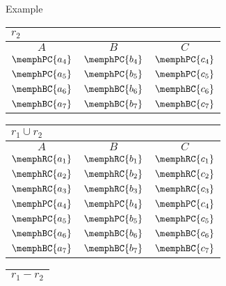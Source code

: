 \begin{multicols}{2}
\begin{CheatsheetEntryFrame}
\begin{RelAlgSubsection}{Example}
{                \begin{tabular}{|ccc|}
                    \multicolumn{3}{l}{\normalsize $r_2$}
                        \\ \hline
                    \multicolumn{1}{|c}{$A$}
                        & \multicolumn{1}{c}{$B$}
                        & \multicolumn{1}{c|}{$C$}
                        \\ \hline\hline
                    $\memphPC{a_4}$ & $\memphPC{b_4}$ & $\memphPC{c_4}$ \\
                    $\memphPC{a_5}$ & $\memphPC{b_5}$ & $\memphPC{c_5}$ \\
                    $\memphBC{a_6}$ & $\memphBC{b_6}$ & $\memphBC{c_6}$ \\
                    $\memphBC{a_7}$ & $\memphBC{b_7}$ & $\memphBC{c_7}$ \\ \hline
                \end{tabular}
            }{%
                \footnotesize%
                \begin{tabular}{|ccc|}
                    \multicolumn{3}{l}{\normalsize $r_1 \cup r_2$}
                        \\ \hline
                    \multicolumn{1}{|c}{$A$}
                        & \multicolumn{1}{c}{$B$}
                        & \multicolumn{1}{c|}{$C$}
                        \\ \hline\hline
                    $\memphRC{a_1}$ & $\memphRC{b_1}$ & $\memphRC{c_1}$ \\
                    $\memphRC{a_2}$ & $\memphRC{b_2}$ & $\memphRC{c_2}$ \\
                    $\memphRC{a_3}$ & $\memphRC{b_3}$ & $\memphRC{c_3}$ \\
                    $\memphPC{a_4}$ & $\memphPC{b_4}$ & $\memphPC{c_4}$ \\
                    $\memphPC{a_5}$ & $\memphPC{b_5}$ & $\memphPC{c_5}$ \\
                    $\memphBC{a_6}$ & $\memphBC{b_6}$ & $\memphBC{c_6}$ \\
                    $\memphBC{a_7}$ & $\memphBC{b_7}$ & $\memphBC{c_7}$ \\ \hline
                \end{tabular}
            }{%
                \footnotesize%
                \begin{tabular}{|ccc|}
                    \multicolumn{3}{l}{\normalsize $r_1 - r_2$}
                        \\ \hline

\end{tabular}}
\end{RelAlgSubsection}
\end{CheatsheetEntryFrame}
\end{multicols}
